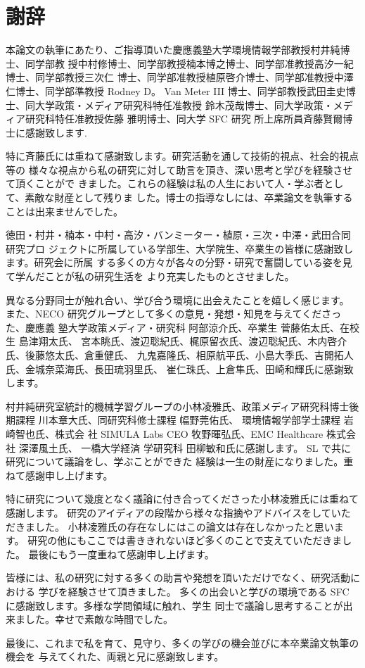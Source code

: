 \chapter*{謝辞}
\label{thanks}

本論文の執筆にあたり、ご指導頂いた慶應義塾大学環境情報学部教授村井純博士、同学部教
授中村修博士、同学部教授楠本博之博士、同学部准教授高汐一紀博士、同学部教授三次仁
博士、同学部准教授植原啓介博士、同学部准教授中澤仁博士、同学部準教授 Rodney D。
Van Meter III 博士、同学部教授武田圭史博士、同大学政策・メディア研究科特任准教授
鈴木茂哉博士、同大学政策・メディア研究科特任准教授佐藤 雅明博士、同大学 SFC 研究
所上席所員斉藤賢爾博士に感謝致します.

特に斉藤氏には重ねて感謝致します。研究活動を通して技術的視点、社会的視点等の
様々な視点から私の研究に対して助言を頂き、深い思考と学びを経験させて頂くことがで
きました。これらの経験は私の人生において人・学ぶ者として、素敵な財産として残りま
した。博士の指導なしには、卒業論文を執筆することは出来ませんでした。

徳田・村井・楠本・中村・高汐・バンミーター・植原・三次・中澤・武田合同研究プロ
ジェクトに所属している学部生、大学院生、卒業生の皆様に感謝致します。研究会に所属
する多くの方々が各々の分野・研究で奮闘している姿を見て学んだことが私の研究生活を
より充実したものとさせました。

異なる分野同士が触れ合い、学び合う環境に出会えたことを嬉しく感じます。
また、NECO 研究グループとして多くの意見・発想・知見を与えてくださった、慶應義
塾大学政策メディア・研究科 阿部涼介氏、卒業生 菅藤佑太氏、在校生 島津翔太氏、
宮本眺氏、渡辺聡紀氏、梶原留衣氏、渡辺聡紀氏、木内啓介氏、後藤悠太氏、倉重健氏、
九鬼嘉隆氏、相原航平氏、小島大季氏、吉開拓人氏、金城奈菜海氏、長田琉羽里氏、
崔仁珠氏、上倉隼氏、田崎和輝氏に感謝致します。

村井純研究室統計的機械学習グループの小林凌雅氏、政策メディア研究科博士後期課程 川本章大氏、同研究科修士課程 幅野莞佑氏、
環境情報学部学士課程 岩崎智也氏、株式会 社 SIMULA Labs CEO 牧野暉弘氏、EMC Healthcare 株式会 社 深澤風土氏、
一橋大学経済 学研究科 田柳敏和氏に感謝します。
SL で共に研究について議論をし、学ぶことができた 経験は一生の財産になりました。重ねて感謝申し上げます。

特に研究について幾度となく議論に付き合ってくださった小林凌雅氏には重ねて感謝します。
研究のアイディアの段階から様々な指摘やアドバイスをしていただきました。
小林凌雅氏の存在なしにはこの論文は存在しなかったと思います。
研究の他にもここでは書ききれないほど多くのことで支えていただきました。
最後にもう一度重ねて感謝申し上げます。

皆様には、私の研究に対する多くの助言や発想を頂いただけでなく、研究活動における
学びを経験させて頂きました。
多くの出会いと学びの環境である SFC に感謝致します。多様な学問領域に触れ、学生
同士で議論し思考することが出来ました。幸せで素敵な時間でした。

最後に、これまで私を育て、見守り、多くの学びの機会並びに本卒業論文執筆の機会を
与えてくれた、両親と兄に感謝致します。




